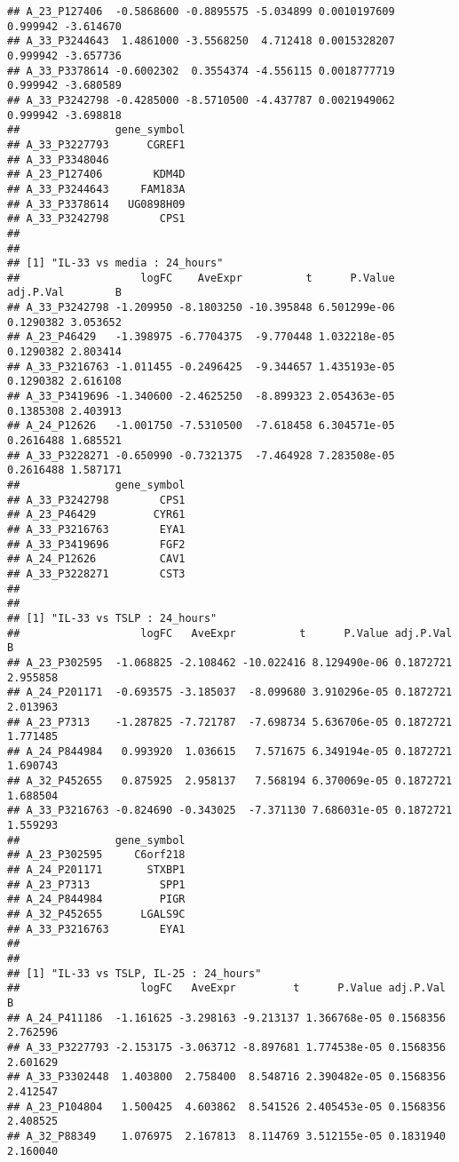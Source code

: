 \documentclass[
]{article}
\begin{document}
\begin{verbatim}
## A_23_P127406  -0.5868600 -0.8895575 -5.034899 0.0010197609  0.999942 -3.614670
## A_33_P3244643  1.4861000 -3.5568250  4.712418 0.0015328207  0.999942 -3.657736
## A_33_P3378614 -0.6002302  0.3554374 -4.556115 0.0018777719  0.999942 -3.680589
## A_33_P3242798 -0.4285000 -8.5710500 -4.437787 0.0021949062  0.999942 -3.698818
##               gene_symbol
## A_33_P3227793      CGREF1
## A_33_P3348046            
## A_23_P127406        KDM4D
## A_33_P3244643     FAM183A
## A_33_P3378614   UG0898H09
## A_33_P3242798        CPS1
## 
## 
## [1] "IL-33 vs media : 24_hours"
##                   logFC    AveExpr          t      P.Value adj.P.Val        B
## A_33_P3242798 -1.209950 -8.1803250 -10.395848 6.501299e-06 0.1290382 3.053652
## A_23_P46429   -1.398975 -6.7704375  -9.770448 1.032218e-05 0.1290382 2.803414
## A_33_P3216763 -1.011455 -0.2496425  -9.344657 1.435193e-05 0.1290382 2.616108
## A_33_P3419696 -1.340600 -2.4625250  -8.899323 2.054363e-05 0.1385308 2.403913
## A_24_P12626   -1.001750 -7.5310500  -7.618458 6.304571e-05 0.2616488 1.685521
## A_33_P3228271 -0.650990 -0.7321375  -7.464928 7.283508e-05 0.2616488 1.587171
##               gene_symbol
## A_33_P3242798        CPS1
## A_23_P46429         CYR61
## A_33_P3216763        EYA1
## A_33_P3419696        FGF2
## A_24_P12626          CAV1
## A_33_P3228271        CST3
## 
## 
## [1] "IL-33 vs TSLP : 24_hours"
##                   logFC   AveExpr          t      P.Value adj.P.Val        B
## A_23_P302595  -1.068825 -2.108462 -10.022416 8.129490e-06 0.1872721 2.955858
## A_24_P201171  -0.693575 -3.185037  -8.099680 3.910296e-05 0.1872721 2.013963
## A_23_P7313    -1.287825 -7.721787  -7.698734 5.636706e-05 0.1872721 1.771485
## A_24_P844984   0.993920  1.036615   7.571675 6.349194e-05 0.1872721 1.690743
## A_32_P452655   0.875925  2.958137   7.568194 6.370069e-05 0.1872721 1.688504
## A_33_P3216763 -0.824690 -0.343025  -7.371130 7.686031e-05 0.1872721 1.559293
##               gene_symbol
## A_23_P302595     C6orf218
## A_24_P201171       STXBP1
## A_23_P7313           SPP1
## A_24_P844984         PIGR
## A_32_P452655      LGALS9C
## A_33_P3216763        EYA1
## 
## 
## [1] "IL-33 vs TSLP, IL-25 : 24_hours"
##                   logFC   AveExpr         t      P.Value adj.P.Val        B
## A_24_P411186  -1.161625 -3.298163 -9.213137 1.366768e-05 0.1568356 2.762596
## A_33_P3227793 -2.153175 -3.063712 -8.897681 1.774538e-05 0.1568356 2.601629
## A_33_P3302448  1.403800  2.758400  8.548716 2.390482e-05 0.1568356 2.412547
## A_23_P104804   1.500425  4.603862  8.541526 2.405453e-05 0.1568356 2.408525
## A_32_P88349    1.076975  2.167813  8.114769 3.512155e-05 0.1831940 2.160040

\end{verbatim}
\end{document}
